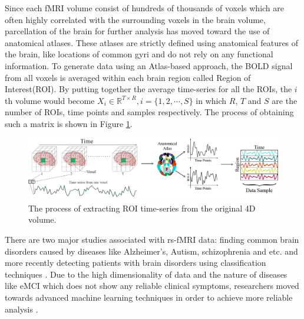 \documentclass[preprint,12pt]{elsarticle}
\begin{document}
	Since each fMRI volume consist of hundreds of thousands of voxels which are often highly correlated with the surrounding voxels in the brain volume, parcellation of the brain for further analysis has moved toward the use
	of anatomical atlases. These atlases are strictly defined using
	anatomical features of the brain, like locations of common gyri
	and do not rely on any functional information.
	To generate data
	using an Atlas-based approach, the BOLD signal from all voxels is averaged within each brain region called Region of Interest(ROI)\cite{r09}.
	By putting together the average time-series for all the ROIs, the $i$th volume would become $X_i \in \mathbb{R}^{T \times R} , i = \{1,2,\cdots, S\}$ in which $R$, $T$ and $S$ are the number of ROIs, time points and samples respectively. 
	The process of obtaining such a matrix is shown in Figure \ref{g1.1}.%
	\begin{figure}[!t]
		\centering
		\includegraphics[width=5.5in]{Data}
		\caption{The process of extracting ROI time-series from the original 4D volume. }
		\label{g1.1}
	\end{figure}
	
	There are two major studies associated with rs-fMRI data: finding common brain disorders caused by diseases like Alzheimer's, Autism, schizophrenia and etc. and more recently detecting patients with brain disorders using classification techniques \cite{r35,r36}. Due to the high dimensionality of data and the nature of diseases like eMCI which does not show any reliable clinical symptoms,
	researchers moved towards advanced machine learning techniques in order to achieve more reliable analysis \cite{r37}.
	
\end{document}
